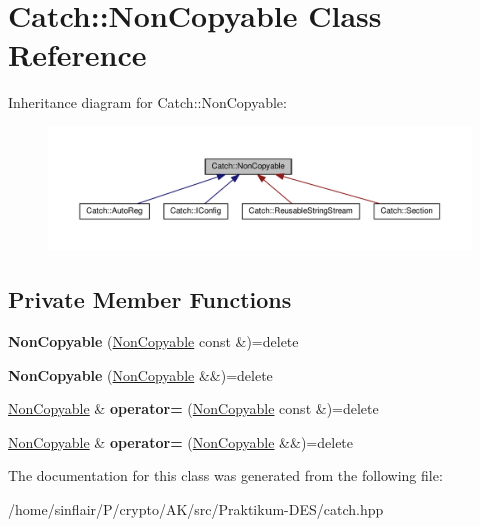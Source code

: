 \hypertarget{classCatch_1_1NonCopyable}{}\section{Catch\+:\+:Non\+Copyable Class Reference}
\label{classCatch_1_1NonCopyable}


Inheritance diagram for Catch\+:\+:Non\+Copyable\+:
\nopagebreak
\begin{figure}[H]
\begin{center}
\leavevmode
\includegraphics[width=350pt]{classCatch_1_1NonCopyable__inherit__graph}
\end{center}
\end{figure}
\subsection*{Private Member Functions}
\begin{DoxyCompactItemize}
\item 
\mbox{\label{classCatch_1_1NonCopyable_a74cf3e4aa051c284941e39b436b2f693}} 
{\bfseries Non\+Copyable} (\hyperlink{classCatch_1_1NonCopyable}{Non\+Copyable} const \&)=delete
\item 
\mbox{\label{classCatch_1_1NonCopyable_a09d1d8775db8c495fa40c285b034faa3}} 
{\bfseries Non\+Copyable} (\hyperlink{classCatch_1_1NonCopyable}{Non\+Copyable} \&\&)=delete
\item 
\mbox{\label{classCatch_1_1NonCopyable_a958b5f57d45fdd6f418bec8b46a629ab}} 
\hyperlink{classCatch_1_1NonCopyable}{Non\+Copyable} \& {\bfseries operator=} (\hyperlink{classCatch_1_1NonCopyable}{Non\+Copyable} const \&)=delete
\item 
\mbox{\label{classCatch_1_1NonCopyable_a317697b6d3c4cda093666ce61d3a1e31}} 
\hyperlink{classCatch_1_1NonCopyable}{Non\+Copyable} \& {\bfseries operator=} (\hyperlink{classCatch_1_1NonCopyable}{Non\+Copyable} \&\&)=delete
\end{DoxyCompactItemize}


The documentation for this class was generated from the following file\+:\begin{DoxyCompactItemize}
\item 
/home/sinflair/\+P/crypto/\+A\+K/src/\+Praktikum-\/\+D\+E\+S/catch.\+hpp\end{DoxyCompactItemize}
